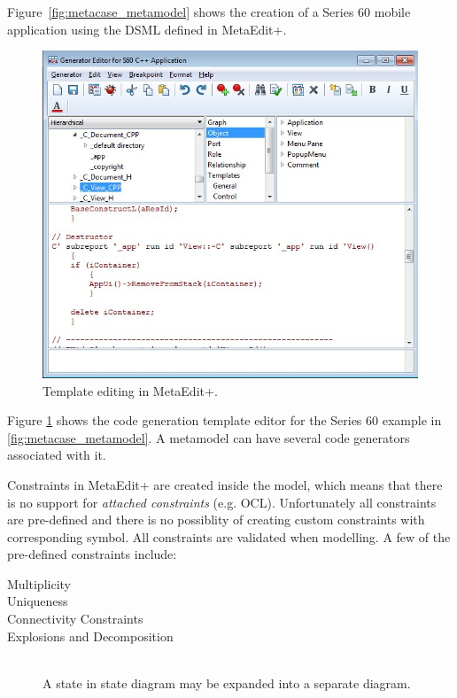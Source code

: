 Figure~\ref{fig:metacase_metamodel} shows the creation of a Series 60 mobile application using the DSML defined in MetaEdit+. 

\begin{figure}[hp]
  \centering
  \centerline{\includegraphics[scale=0.6]{images/me_template_editor.jpeg}}
  \caption[MetaEdit+ template editor]{Template editing in MetaEdit+.}
  \label{fig:metacase_template}
\end{figure}

Figure \ref{fig:metacase_template} shows the code generation template editor for the Series 60 example in \ref{fig:metacase_metamodel}. A metamodel can have several code generators associated with it.

Constraints in MetaEdit+ are created inside the model, which means that there is no support for \emph{attached constraints} (e.g. OCL). Unfortunately all constraints are pre-defined and there is no possiblity of creating custom constraints with corresponding symbol. All constraints are validated when modelling. A few of the pre-defined constraints include:
\begin{description}
  \item[Multiplicity]
  \item[Uniqueness]
  \item[Connectivity Constraints]
  \item[Explosions and Decomposition] \hfill \\
  A state in state diagram may be expanded into a separate diagram.
\end{description} 

